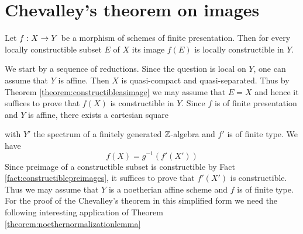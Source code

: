 \section{Chevalley's theorem on images}

\begin{theorem}\label{theorem:chevalleysimagetheorem}
Let $f:X\rightarrow Y$ be a morphism of schemes of finite presentation. Then for every locally constructible subset $E$ of $X$ its image $f(E)$ is locally constructible in $Y$.
\end{theorem}
\noindent
We start by a sequence of reductions. Since the question is local on $Y$, one can assume that $Y$ is affine. Then $X$ is quasi-compact and quasi-separated. Thus by Theorem \ref{theorem:constructibleasimage} we may assume that $E = X$ and hence it suffices to prove that $f(X)$ is constructible in $Y$. Since $f$ is of finite presentation and $Y$ is affine, there exists a cartesian square
\begin{center}
\end{center}
with $Y'$ the spectrum of a finitely generated ${\mathbb Z}$-algebra and $f'$ is of finite type. We have 
$$f(X) = g^{-1}\left(f'(X')\right)$$
Since preimage of a constructible subset is constructible by Fact \ref{fact:constructiblepreimages}, it suffices to prove that $f'(X')$ is constructible. Thus we may assume that $Y$ is a noetherian affine scheme and $f$ is of finite type.\\
For the proof of the Chevalley's theorem in this simplified form we need the following interesting application of Theorem \ref{theorem:noethernormalizationlemma}

